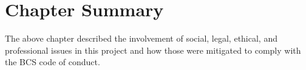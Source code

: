 \section{Chapter Summary}

The above chapter described the involvement of social, legal, ethical, and professional issues in this project and how those were mitigated to comply with the BCS code of conduct.